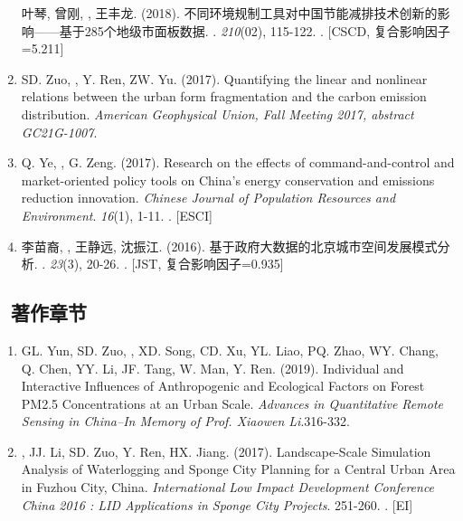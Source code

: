 \begin{enumerate}
    叶琴, 曾刚, {}, 王丰龙. (2018).
	不同环境规制工具对中国节能减排技术创新的影响——基于285个地级市面板数据.
    {}. \textit{210}(02), 115-122.
    . [CSCD, 复合影响因子=5.211]
\item
    SD. Zuo, \Shaoqing, Y. Ren, ZW. Yu. (2017).
    Quantifying the linear and nonlinear relations between the urban form fragmentation and the carbon emission distribution.
    \textit{American Geophysical Union, Fall Meeting 2017, abstract GC21G-1007}.
\item
    Q. Ye, \Shaoqing, G. Zeng. (2017).
	Research on the effects of command-and-control and market-oriented policy tools on China’s energy conservation and emissions reduction innovation.
    \textit{Chinese Journal of Population Resources and Environment}. \textit{16}(1), 1-11.
    . [ESCI]
\item
   李苗裔, {}, 王静远, 沈振江. (2016).
	基于政府大数据的北京城市空间发展模式分析.
    {}. \textit{23}(3), 20-26.
    . [JST, 复合影响因子=0.935]
\end{enumerate}

\subsection*{\texorpdfstring{\faBook\ 著作章节}{著作章节}}
\begin{enumerate}
\item
    GL. Yun, SD. Zuo, \Shaoqing, XD. Song, CD. Xu, YL. Liao, PQ. Zhao, WY. Chang, Q. Chen, YY. Li, JF. Tang, W. Man, Y. Ren. (2019).
	Individual and Interactive Influences of Anthropogenic and Ecological Factors on Forest PM2.5 Concentrations at an Urban Scale.
    \textit{Advances in Quantitative Remote Sensing in China–In Memory of Prof. Xiaowen Li}.316-332.
\item
    \Shaoqing, JJ. Li, SD. Zuo, Y. Ren, HX. Jiang. (2017).
	Landscape-Scale Simulation Analysis of Waterlogging and Sponge City Planning for a Central Urban Area in Fuzhou City, China.
    \textit{International Low Impact Development Conference China 2016 : LID Applications in Sponge City Projects}. 251-260.
    . [EI]
\end{enumerate}

